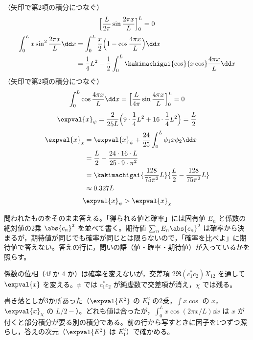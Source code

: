 （矢印で第2項の積分につなぐ）
\[ \Bigl[\frac{L}{2\pi}\sin\frac{2\pi x}{L}\Bigr]_{0}^{L}=0 \]
\begin{align*}
\int_{0}^{L}x\sin^{2}\frac{2\pi x}{L}\dd x&=\int_{0}^{L}\frac{x}{2}\Bigl(1-\cos\frac{4\pi x}{L}\Bigr)\dd x\\
&=\frac{1}{4}L^{2}-\frac{1}{2}\int_{0}^{L}\kakimachigai{\cos}{x\cos}\frac{4\pi x}{L}\dd x
\end{align*}
（矢印で第2項の積分につなぐ）
\[ \int_{0}^{L}\cos\frac{4\pi x}{L}\dd x=\Bigl[\frac{L}{4\pi}\sin\frac{4\pi x}{L}\Bigr]_{0}^{L}=0 \]
\[ \expval{x}_{\psi}=\frac{2}{25L}\Bigl(9\cdot\frac{1}{4}L^{2}+16\cdot\frac{1}{4}L^{2}\Bigr)=\frac{L}{2} \]
\begin{align*}
\expval{x}_{\chi}&=\expval{x}_{\psi}+\frac{24}{25}\int_{0}^{L}\phi_{1}x\phi_{2}\dd x\\
&=\frac{L}{2}-\frac{24\cdot16\cdot L}{25\cdot9\cdot\pi^{2}}\\
&=\kakimachigai{\frac{128}{75\pi^{2}}L}{\frac{L}{2}-\frac{128}{75\pi^{2}}L}\\
&\approx 0.327L
\end{align*}
\[ \expval{x}_{\psi}>\expval{x}_{\chi} \]
\item 問われたものをそのまま答える。「得られる値と確率」には固有値 $E_{n}$ と係数の絶対値の2乗 $\abs{c_{n}}^{2}$ を並べて書く。期待値 $\sum_{n}E_{n}\abs{c_{n}}^{2}$ は確率から決まるが，期待値が同じでも確率が同じとは限らないので，「確率を比べよ」に期待値で答えない。答えの行に，問いの語（値・確率・期待値）が入っているかを照らす。
\item 係数の位相（$4\ii$ か $4$ か）は確率を変えないが，交差項 $2\Re(c_{1}^{*}c_{2})X_{12}$ を通して $\expval{x}$ を変える。$\psi$ では $c_{1}^{*}c_{2}$ が純虚数で交差項が消え，$\chi$ では残る。
\item 書き落としが3か所あった（$\expval{E^{2}}$ の $E_{1}^{2}$ の2乗，$\int x\cos$ の $x$，$\expval{x}_{\chi}$ の $L/2-$）。どれも値は合ったが，$\int_{0}^{L}x\cos(2\pi x/L)\dd x$ は $x$ が付くと部分積分が要る別の積分である。前の行から写すときに因子を1つずつ照らし，答えの次元（$\expval{E^{2}}$ は $E_{1}^{2}$）で確かめる。
